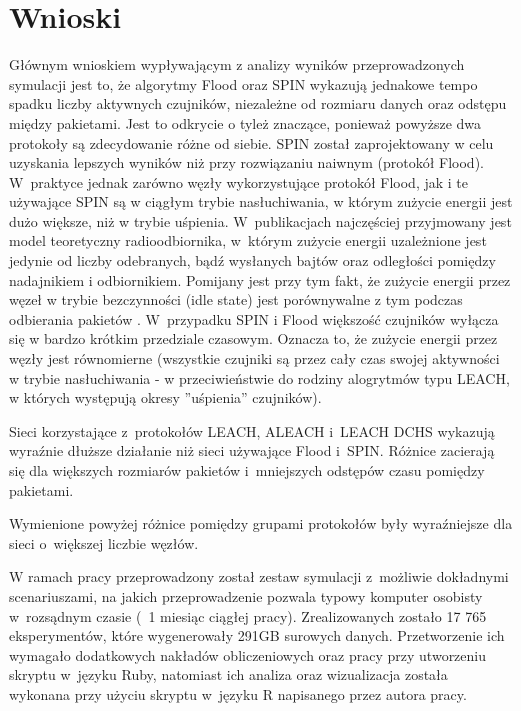\chapter{Wnioski}
Głównym wnioskiem wypływającym z analizy wyników przeprowadzonych symulacji jest to, że algorytmy Flood oraz SPIN wykazują jednakowe tempo spadku liczby aktywnych czujników, niezależne od rozmiaru danych oraz odstępu między pakietami. Jest to odkrycie o tyleż znaczące, ponieważ powyższe dwa protokoły są zdecydowanie różne od siebie. SPIN został zaprojektowany w celu uzyskania lepszych wyników niż przy rozwiązaniu naiwnym (protokół Flood). W~praktyce jednak zarówno węzły wykorzystujące protokół Flood, jak i te używające SPIN są w ciągłym trybie nasłuchiwania, w którym zużycie energii jest dużo większe, niż w trybie uśpienia. W~publikacjach najczęściej przyjmowany jest model teoretyczny radioodbiornika, w~którym zużycie energii uzależnione jest jedynie od liczby odebranych, bądź wysłanych bajtów oraz odległości pomiędzy nadajnikiem i odbiornikiem. Pomijany jest przy tym fakt, że zużycie energii przez węzeł w trybie bezczynności (idle state) jest porównywalne z tym podczas odbierania pakietów \cite{Odey2013}.
W~przypadku SPIN i Flood większość czujników wyłącza się w bardzo krótkim przedziale czasowym. Oznacza to, że zużycie energii przez węzły jest równomierne (wszystkie czujniki są przez cały czas swojej aktywności w trybie nasłuchiwania - w przeciwieństwie do rodziny alogrytmów typu LEACH, w których występują okresy ''uśpienia'' czujników).

Sieci korzystające z~protokołów LEACH, ALEACH i~LEACH DCHS wykazują wyraźnie dłuższe działanie niż sieci używające Flood i~SPIN.
Różnice zacierają się dla większych rozmiarów pakietów i~mniejszych odstępów czasu pomiędzy pakietami.

Wymienione powyżej różnice pomiędzy grupami protokołów były wyraźniejsze dla sieci o~większej liczbie węzłów.

W ramach pracy przeprowadzony został zestaw symulacji z~możliwie dokładnymi scenariuszami, na jakich przeprowadzenie pozwala typowy komputer osobisty w~rozsądnym czasie (~1 miesiąc ciągłej pracy). Zrealizowanych zostało 17 765 eksperymentów, które wygenerowały 291GB surowych danych. Przetworzenie ich wymagało dodatkowych nakładów obliczeniowych oraz pracy przy utworzeniu skryptu w~języku Ruby, natomiast ich analiza oraz wizualizacja została wykonana przy użyciu skryptu w~języku R napisanego przez autora pracy.


